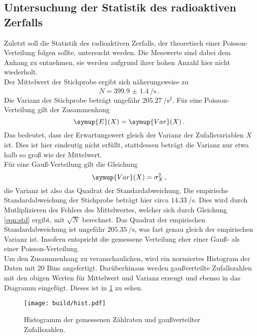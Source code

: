 \subsection{Untersuchung der Statistik des radioaktiven Zerfalls}
\label{subsec:statistik}
Zuletzt soll die Statistik des radioaktiven Zerfalls, der theoretisch einer Poisson-Verteilung folgen sollte,
untersucht werden. Die Messwerte sind dabei dem Anhang zu entnehmen, sie werden aufgrund ihrer
hohen Anzahl hier nicht wiederholt. \\
Der Mittelwert der Stichprobe ergibt sich näherungsweise zu
\begin{equation*}
  \overline{N} = \SI{399.9(14)}{\per\second}\,.
\end{equation*}
Die Varianz der Stichprobe beträgt ungefähr $\SI{205.27}{\per\second\squared}$.
Für eine Poisson-Verteilung gilt der Zusammenhang
\begin{equation*}
	\symup{E}(X) = \symup{Var}(X)\,.
\end{equation*}
Das bedeutet, dass der Erwartungswert gleich der Varianz der Zufallsvariablen $X$
ist. Dies ist hier eindeutig nicht erfüllt, stattdessen beträgt die Varianz nur etwa halb so groß wie der Mittelwert.\\
Für eine Gauß-Verteilung gilt die Gleichung
\begin{equation*}
	\symup{Var}(X) = \sigma_X^2\,,
\end{equation*}
die Varianz ist also das Quadrat der Standardabweichung. Die empirische Standardabweichung
der Stichprobe beträgt hier circa $\SI{14.33}{\per\second}$. Dies wird durch Mutliplizieren
des Fehlers des Mittelwertes, welcher sich durch Gleichung \eqref{eqn:std} ergibt, mit $\sqrt{N}$ berechnet.
Das Quadrat der empirischen Standardabweichung ist ungefähr $\SI{205.35}{\per\second}$, was
fast genau gleich der empirischen Varianz ist. Insofern entspricht die gemessene Verteilung
eher einer Gauß- als einer Poisson-Verteilung.\\
Um den Zusammenhang zu veranschaulichen, wird ein normiertes Histogram der Daten
mit 20 Bins angefertigt. Darüberhinaus werden gaußverteilte Zufallszahlen mit den obigen
Werten für Mittelwert und Varianz erzeugt und ebenso in das Diagramm eingefügt.
Dieses ist in \ref{fig:hist} zu sehen.

\begin{figure}
  \centering
  \texttt{[image: build/hist.pdf]}
  \caption{Histogramm der gemessenen Zählraten und gaußverteilter Zufallszahlen.}
  \label{fig:hist}
\end{figure}
